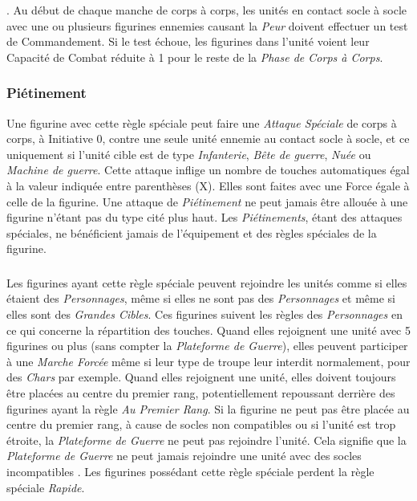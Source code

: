 . Au début de chaque manche de corps à corps, les unités en contact socle à socle avec une ou plusieurs figurines ennemies causant la \emph{Peur} doivent effectuer un test de Commandement. Si le test échoue, les figurines dans l'unité voient leur Capacité de Combat réduite à 1 pour le reste de la \emph{Phase de Corps à Corps}.

\subsubsection*{Piétinement }

Une figurine avec cette règle spéciale peut faire une \emph{Attaque Spéciale} de corps à corps, à Initiative 0, contre une seule unité ennemie au contact socle à socle, et ce uniquement si l'unité cible est de type \emph{Infanterie}, \emph{Bête de guerre}, \emph{Nuée} ou \emph{Machine de guerre}. Cette attaque inflige un nombre de touches automatiques égal à la valeur indiquée entre parenthèses (X). Elles sont faites avec une Force égale à celle de la figurine. Une attaque de \emph{Piétinement} ne peut jamais être allouée à une figurine n'étant pas du type cité plus haut. Les \emph{Piétinements}, étant des attaques spéciales, ne bénéficient jamais de l'équipement et des règles spéciales de la figurine. 

\subsubsection*{}

Les figurines ayant cette règle spéciale peuvent rejoindre les unités comme si elles étaient des \emph{Personnages}, même si elles ne sont pas des \emph{Personnages} et même si elles sont des \emph{Grandes Cibles}. Ces figurines suivent les règles des \emph{Personnages} en ce qui concerne la répartition des touches. Quand elles rejoignent une unité avec 5 figurines ou plus (sans compter la \emph{Plateforme de Guerre}), elles peuvent participer à une \emph{Marche Forcée} même si leur type de troupe leur interdit normalement, pour des \emph{Chars} par exemple. Quand elles rejoignent une unité, elles doivent toujours être placées au centre du premier rang, potentiellement repoussant derrière des figurines ayant la règle \emph{Au Premier Rang}. Si la figurine ne peut pas être placée au centre du premier rang, à cause de socles non compatibles ou si l'unité est trop étroite, la \emph{Plateforme de Guerre} ne peut pas rejoindre l'unité. Cela signifie que la \emph{Plateforme de Guerre} ne peut jamais rejoindre une unité avec des socles incompatibles . Les figurines possédant cette règle spéciale perdent la règle spéciale \emph{Rapide}.

